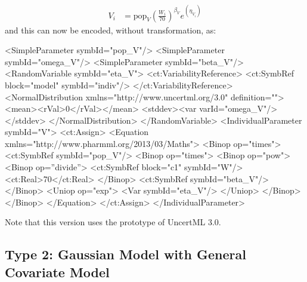 \documentclass[a4paper,11pt]{article}
\newcommand{\uncertml}{UncertML\xspace}
\begin{document}
\begin{align*}
V_i &= \mathrm{pop}_{V} \left(\frac{W_{i}}{70}\right)^{\beta_{V}} e^{\left(\eta_{V_i} \right)}
\end{align*}
%
and this can now be encoded, without transformation, as:
%
\begin{xmlcode}
<SimpleParameter symbId="pop_V"/>
<SimpleParameter symbId="omega_V"/>
<SimpleParameter symbId="beta_V"/>
<RandomVariable symbId="eta_V">
    <ct:VariabilityReference>
        <ct:SymbRef block="model" symbId="indiv"/>
    </ct:VariabilityReference>
    <NormalDistribution xmlns="http://www.uncertml.org/3.0" definition="">
        <mean><rVal>0</rVal></mean>
        <stddev><var varId="omega_V"/></stddev>
     </NormalDistribution>                            
 </RandomVariable>
<IndividualParameter symbId="V">
    <ct:Assign>
        <Equation xmlns="http://www.pharmml.org/2013/03/Maths">
            <Binop op="times">
                <ct:SymbRef symbId="pop_V"/>
                <Binop op="times">
                    <Binop op="pow">
                        <Binop op=''divide''>
                            <ct:SymbRef block="c1" symbId="W"/>
                            <ct:Real>70</ct:Real>
                        </Binop>
                        <ct:SymbRef symbId="beta_V"/>
                    </Binop>
                    <Uniop op="exp">
                        <Var symbId="eta_V"/>
                    </Uniop>
                </Binop>
            </Binop>
        </Equation>
    </ct:Assign>
</IndividualParameter>
\end{xmlcode}

Note that this version uses the prototype of \uncertml 3.0.

\subsection{Type 2: Gaussian Model with General Covariate Model}
\end{document}
